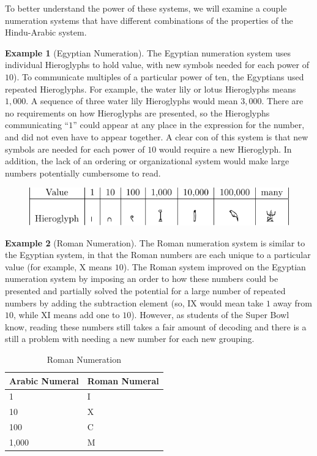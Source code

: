 \documentclass[
]{book}
\theoremstyle{definition}
\theoremstyle{definition}
\newtheorem{example}{Example}[chapter]
\theoremstyle{definition}
\theoremstyle{remark}
\begin{document}
To better understand the power of these systems, we will examine a couple numeration systems that have different combinations of the properties of the Hindu-Arabic system.

\begin{example}[Egyptian Numeration]
\protect\hypertarget{exm:unnamed-chunk-59}{}{\label{exm:unnamed-chunk-59} {} }The Egyptian numeration system uses individual Hieroglyphs to hold value, with new symbols needed for each power of \(10\)). To communicate multiples of a particular power of ten, the Egyptians used repeated Hieroglyphs. For example, the water lily or lotus Hieroglyphs means \(1,000\). A sequence of three water lily Hieroglyphs would mean \(3,000\). There are no requirements on how Hieroglyphs are presented, so the Hieroglyphs communicating ``\(1\)'' could appear at any place in the expression for the number, and did not even have to appear together. A clear con of this system is that new symbols are needed for each power of \(10\) would require a new Hieroglyph. In addition, the lack of an ordering or organizational system would make large numbers potentially cumbersome to read.
\end{example}
\begin{figure}

{\centering \includegraphics[width=0.9\linewidth]{tikz/hieroglyphs} 

}

\end{figure}

\begin{example}[Roman Numeration]
\protect\hypertarget{exm:unnamed-chunk-61}{}{\label{exm:unnamed-chunk-61} {} }The Roman numeration system is similar to the Egyptian system, in that the Roman numbers are each unique to a particular value (for example, X means \(10\)). The Roman system improved on the Egyptian numeration system by imposing an order to how these numbers could be presented and partially solved the potential for a large number of repeated numbers by adding the subtraction element (so, IX would mean take \(1\) away from \(10\), while XI means add one to \(10\)). However, as students of the Super Bowl know, reading these numbers still takes a fair amount of decoding and there is a still a problem with needing a new number for each new grouping.
\end{example}
\begin{table}

\caption{\label{tab:roman}Roman Numeration}
\centering
\begin{tabular}[t]{l|l}
\hline
Arabic Numeral & Roman Numeral\\
\hline
1 & I\\
\hline
10 & X\\
\hline
100 & C\\
\hline
1,000 & M\\
\hline
\end{tabular}
\end{table}
\end{document}

